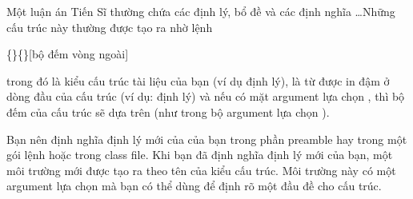 \documentclass[a4paper]{report}
\begin{document}
Một luận án Tiến Sĩ thường chứa các định lý, bổ đề và các định nghĩa \ldots Những cấu trúc này thường được tạo ra nhờ lệnh

\begin{definition}
\{\}\{\}[bộ đếm vòng ngoài]
\end{definition}%
trong đó   là kiểu cấu trúc tài liệu của bạn (ví dụ định lý),  là từ được in đậm ở dòng đầu của cấu trúc (ví dụ: định lý) và nếu có mặt argument lựa chọn , thì
bộ đếm của cấu trúc sẽ dựa trên  (như trong bộ argument lựa chọn ).

Bạn nên định nghĩa định lý mới của của bạn trong phần preamble hay trong một gói lệnh hoặc trong class file. Khi bạn đã định nghĩa định lý mới của bạn, một môi trường mới được tạo ra theo tên của kiểu cấu trúc. Môi trường này có một argument lựa chọn mà bạn có thể dùng để định rõ một đầu đề cho cấu trúc.
\end{document}
